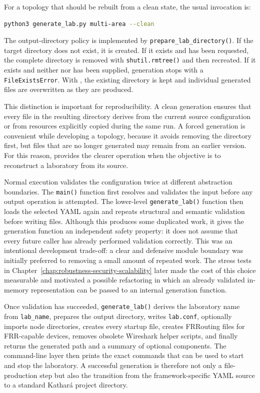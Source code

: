 For a topology that should be rebuilt from a clean state, the usual invocation
is:

\begin{lstlisting}[language=bash,caption={Clean regeneration of a laboratory.},label={lst:generate-clean}]
python3 generate_lab.py multi-area --clean
\end{lstlisting}

The output-directory policy is implemented by \texttt{prepare\_lab\_directory()}.
If the target directory does not exist, it is created. If it exists and
 has been requested, the complete directory is removed with
\texttt{shutil.rmtree()} and then recreated. If it exists and neither
 nor  has been supplied, generation stops with
a \texttt{FileExistsError}. With , the existing directory is
kept and individual generated files are overwritten as they are produced.

This distinction is important for reproducibility. A clean generation ensures
that every file in the resulting directory derives from the current source
configuration or from resources explicitly copied during the same run. A forced
generation is convenient while developing a topology, because it avoids
removing the directory first, but files that are no longer generated may remain
from an earlier version. For this reason,  provides the clearer
operation when the objective is to reconstruct a laboratory from its source.

Normal execution validates the configuration twice at different abstraction
boundaries. The \texttt{main()} function first resolves and validates the input
before any output operation is attempted. The lower-level
\texttt{generate\_lab()} function then loads the selected YAML again and repeats
structural and semantic validation before writing files. Although this produces
some duplicated work, it gives the generation function an independent safety
property: it does not assume that every future caller has already performed
validation correctly. This was an intentional development trade-off: a clear
and defensive module boundary was initially preferred to removing a small
amount of repeated work. The stress tests in
Chapter~\ref{chap:robustness-security-scalability} later made the cost of this
choice measurable and motivated a possible refactoring in which an already
validated in-memory representation can be passed to an internal generation
function.

Once validation has succeeded, \texttt{generate\_lab()} derives the laboratory
name from \texttt{lab\_name}, prepares the output directory, writes
\texttt{lab.conf}, optionally imports node directories, creates every startup
file, creates FRRouting files for FRR-capable devices, removes obsolete
Wireshark helper scripts, and finally returns the generated path and a summary
of optional components. The command-line layer then prints the exact commands
that can be used to start and stop the laboratory. A successful generation is
therefore not only a file-production step but also the transition from the
framework-specific YAML source to a standard Kathar\'a project directory.

